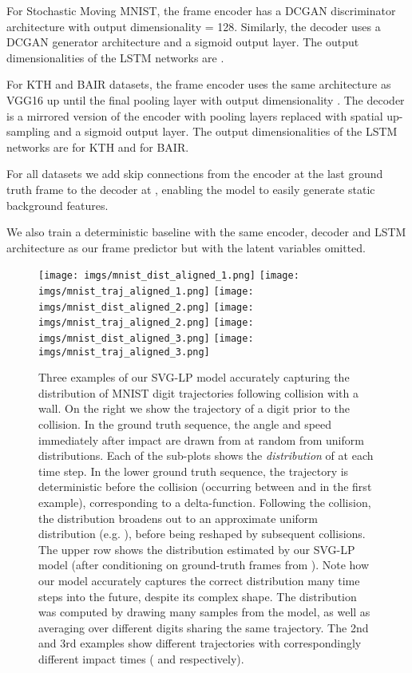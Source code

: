 For Stochastic Moving MNIST, the frame encoder has a DCGAN
discriminator architecture \cite{radford2016} with output dimensionality  = 128.
Similarly, the decoder uses a DCGAN generator architecture and a sigmoid output layer.
The output dimensionalities of the LSTM networks are 
. 

For KTH and BAIR datasets, the frame encoder uses the same architecture as VGG16 \cite{vgg} up until the final pooling layer with output dimensionality . The decoder is a mirrored version of the encoder with pooling layers replaced with spatial up-sampling and a sigmoid output layer.
The output dimensionalities of the LSTM networks are 
 for KTH and  for BAIR. 

For all datasets we add
skip connections from the encoder at the last ground truth frame to the decoder at , enabling the model to easily generate static
background features.

We also train a deterministic baseline with the same encoder, decoder and LSTM architecture as our frame predictor  but with the latent variables omitted.


\begin{figure*}[t!]
\centering
     \texttt{[image: imgs/mnist\_dist\_aligned\_1.png]}
     \texttt{[image: imgs/mnist\_traj\_aligned\_1.png]}
\noindent\makebox[\linewidth]{\rule{0.99\linewidth}{0.4pt}}
     \texttt{[image: imgs/mnist\_dist\_aligned\_2.png]}
     \texttt{[image: imgs/mnist\_traj\_aligned\_2.png]}
\noindent\makebox[\linewidth]{\rule{0.99\linewidth}{0.4pt}}
     \texttt{[image: imgs/mnist\_dist\_aligned\_3.png]}
     \texttt{[image: imgs/mnist\_traj\_aligned\_3.png]}
 \caption{Three examples of our SVG-LP model accurately capturing the
   distribution of MNIST digit trajectories following collision with
   a wall. On the right we show the trajectory of a digit prior to the
   collision. In the ground truth sequence, the angle and speed
   immediately after impact are drawn from at random from uniform distributions.
Each of
   the sub-plots shows the {\em distribution} of 
   at each time step. In the lower ground truth sequence, the
   trajectory is deterministic before the collision (occurring between
    and 
   in the first example), corresponding to a delta-function. Following
   the collision, the distribution broadens out to an approximate
   uniform distribution (e.g. ), before being reshaped by
   subsequent collisions. The upper row shows the distribution
   estimated by our SVG-LP model (after conditioning on ground-truth
   frames from ). Note how our model accurately captures
   the correct distribution many time steps into the future, despite its
   complex shape. The distribution was computed by drawing many
   samples from the model, as well as averaging over different digits
   sharing the same trajectory. The 2nd and 3rd
   examples show different trajectories with correspondingly different impact times
   ( and  respectively). }
\label{fig:mnist_dist}
\end{figure*}

